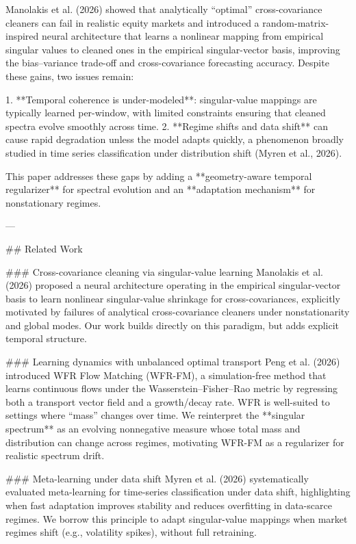 Manolakis et al. (2026) showed that analytically “optimal” cross-covariance cleaners can fail in realistic equity markets and introduced a random-matrix-inspired neural architecture that learns a nonlinear mapping from empirical singular values to cleaned ones in the empirical singular-vector basis, improving the bias–variance trade-off and cross-covariance forecasting accuracy. Despite these gains, two issues remain:

1. **Temporal coherence is under-modeled**: singular-value mappings are typically learned per-window, with limited constraints ensuring that cleaned spectra evolve smoothly across time.  
2. **Regime shifts and data shift** can cause rapid degradation unless the model adapts quickly, a phenomenon broadly studied in time series classification under distribution shift (Myren et al., 2026).

This paper addresses these gaps by adding a **geometry-aware temporal regularizer** for spectral evolution and an **adaptation mechanism** for nonstationary regimes.

---

## Related Work  

### Cross-covariance cleaning via singular-value learning  
Manolakis et al. (2026) proposed a neural architecture operating in the empirical singular-vector basis to learn nonlinear singular-value shrinkage for cross-covariances, explicitly motivated by failures of analytical cross-covariance cleaners under nonstationarity and global modes. Our work builds directly on this paradigm, but adds explicit temporal structure.

### Learning dynamics with unbalanced optimal transport  
Peng et al. (2026) introduced WFR Flow Matching (WFR-FM), a simulation-free method that learns continuous flows under the Wasserstein–Fisher–Rao metric by regressing both a transport vector field and a growth/decay rate. WFR is well-suited to settings where “mass” changes over time. We reinterpret the **singular spectrum** as an evolving nonnegative measure whose total mass and distribution can change across regimes, motivating WFR-FM as a regularizer for realistic spectrum drift.

### Meta-learning under data shift  
Myren et al. (2026) systematically evaluated meta-learning for time-series classification under data shift, highlighting when fast adaptation improves stability and reduces overfitting in data-scarce regimes. We borrow this principle to adapt singular-value mappings when market regimes shift (e.g., volatility spikes), without full retraining.

